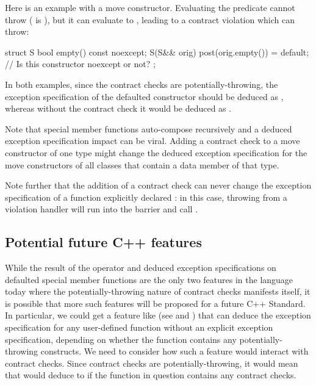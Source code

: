 Here is an example with a move constructor. Evaluating the predicate cannot throw ( is ), but it can evaluate to , leading to a contract violation which can throw:

\begin{codeblock}
struct S {
  bool empty() const noexcept;
  S(S&& orig) post(orig.empty()) = default;  // Is this constructor noexcept or not?
};
\end{codeblock}

In both examples, since the contract checks are potentially-throwing, the exception specification of the defaulted constructor should be deduced as , whereas without the contract check it would be deduced as .

Note that special member functions auto-compose recursively and a deduced exception specification impact can be viral. Adding a contract check to a move constructor of one type might change the deduced exception specification for the move constructors of all classes that contain a data member of that type.

Note further that the addition of a contract check can never change the exception specification of a function explicitly declared : in this case, throwing from a violation handler will run into the  barrier and call .

\subsection{Potential future C++ features}

While the result of the  operator and deduced exception specifications on defaulted special member functions are the only two features in the language today where the potentially-throwing nature of contract checks manifests itself, it is possible that more such features will be proposed for a future C++ Standard. In particular, we could get a feature like  (see \cite{N4473} and \cite{P0133R0}) that can deduce the exception specification for any user-defined function without an explicit exception specification, depending on whether the function contains any potentially-throwing constructs. We need to consider how such a feature would interact with contract checks. Since contract checks are potentially-throwing, it would mean that  would deduce to  if the function in question contains any contract checks.

